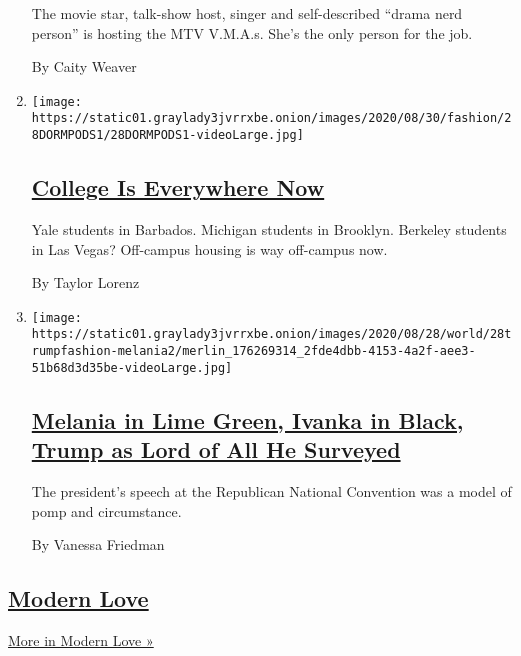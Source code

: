 \begin{enumerate}
  The movie star, talk-show host, singer and self-described ``drama nerd
  person'' is hosting the MTV V.M.A.s. She's the only person for the
  job.

  By Caity Weaver
\item
  \texttt{[image: https://static01.graylady3jvrrxbe.onion/images/2020/08/30/fashion/28DORMPODS1/28DORMPODS1-videoLarge.jpg]}

  \hypertarget{college-is-everywhere-now}{%
  \subsection{\texorpdfstring{\href{/2020/08/28/style/college-collab-houses-coronavirus.html}{College
  Is Everywhere
  Now}}{College Is Everywhere Now}}\label{college-is-everywhere-now}}

  Yale students in Barbados. Michigan students in Brooklyn. Berkeley
  students in Las Vegas? Off-campus housing is way off-campus now.

  By Taylor Lorenz
\item
  \texttt{[image: https://static01.graylady3jvrrxbe.onion/images/2020/08/28/world/28trumpfashion-melania2/merlin\_176269314\_2fde4dbb-4153-4a2f-aee3-51b68d3d35be-videoLarge.jpg]}

  \hypertarget{melania-in-lime-green-ivanka-in-black-trump-as-lord-of-all-he-surveyed}{%
  \subsection{\texorpdfstring{\href{/2020/08/28/style/melania-trump-ivanka-trump-donald-trump-rnc.html}{Melania
  in Lime Green, Ivanka in Black, Trump as Lord of All He
  Surveyed}}{Melania in Lime Green, Ivanka in Black, Trump as Lord of All He Surveyed}}\label{melania-in-lime-green-ivanka-in-black-trump-as-lord-of-all-he-surveyed}}

  The president's speech at the Republican National Convention was a
  model of pomp and circumstance.

  By Vanessa Friedman
\end{enumerate}

\hypertarget{modern-love}{%
\subsection{\texorpdfstring{\href{/column/modern-love}{Modern
Love}}{Modern Love}}\label{modern-love}}

\href{/column/modern-love}{More in Modern Love »}

